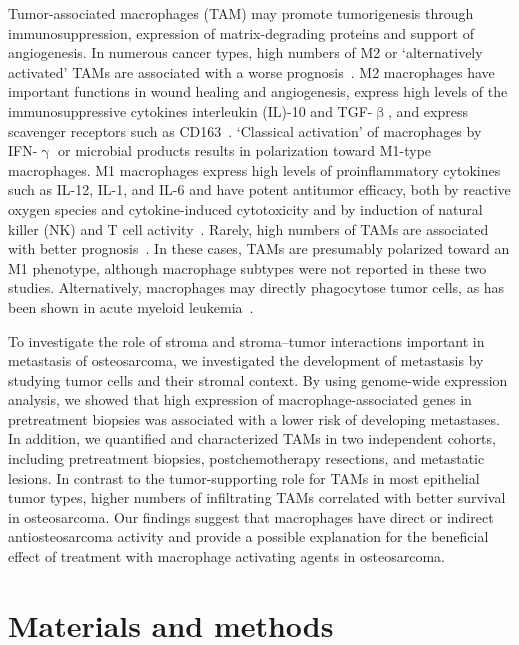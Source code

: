 Tumor\hyp{}associated macrophages (TAM) may promote
tumorigenesis through immunosuppression, expression
of matrix\hyp{}degrading proteins and support of angiogenesis.
In numerous cancer types, high numbers of M2 or `alternatively
activated' TAMs are associated with a worse prognosis~\cite{hagemann2006ovarian,lee2008prognostic,lissbrant2000tumor,volodko1998tumour,jensen2009macrophage,van2009anti}. M2 macrophages have important functions
in wound healing and angiogenesis, express high levels of
the immunosuppressive cytokines interleukin (IL)-10 and
TGF-$\upbeta$, and express scavenger receptors such as CD163~\cite{sica2008macrophage,qian2010macrophage}.
`Classical activation' of macrophages by IFN-$\upgamma$ or
microbial products results in polarization toward M1-type
macrophages. M1 macrophages express high levels of
proinflammatory cytokines such as IL-12, IL-1, and IL-6
and have potent antitumor efficacy, both by reactive oxygen
species and cytokine\hyp{}induced cytotoxicity and by
induction of natural killer (NK) and T cell activity~\cite{mosser2008exploring}.
Rarely, high numbers of TAMs are associated with better
prognosis~\cite{kim2008high,forssell2007high}. In these cases, TAMs are presumably
polarized toward an M1 phenotype, although macrophage
subtypes were not reported in these two studies. Alternatively,
macrophages may directly phagocytose tumor cells, as has
been shown in acute myeloid leukemia~\cite{jaiswal2010macrophages}.

To investigate the role of stroma and stroma--tumor
interactions important in metastasis of osteosarcoma, we
investigated the development of metastasis by studying
tumor cells and their stromal context. By using genome\hyp{}wide
expression analysis, we showed that high expression
of macrophage\hyp{}associated genes in pretreatment biopsies
was associated with a lower risk of developing metastases.
In addition, we quantified and characterized TAMs in two
independent cohorts, including pretreatment biopsies,
postchemotherapy resections, and metastatic lesions. In
contrast to the tumor\hyp{}supporting role for TAMs in most
epithelial tumor types, higher numbers of infiltrating TAMs
correlated with better survival in osteosarcoma. Our findings
suggest that macrophages have direct or indirect antiosteosarcoma
activity and provide a possible explanation
for the beneficial effect of treatment with macrophage
activating agents in osteosarcoma.

\section{Materials and methods}\label{methods4}
